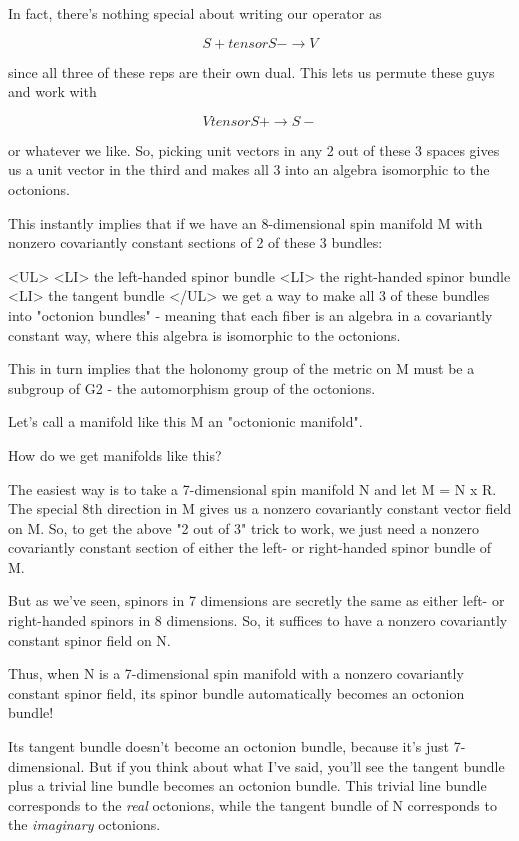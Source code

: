 In fact, there's nothing special about writing our operator as


$$

S+ tensor S- \to  V
$$
    
since all three of these reps are their own dual.  This lets us
permute these guys and work with


$$

V tensor S+ \to  S-
$$
    
or whatever we like.   So, picking unit vectors in any 2 out of these
3 spaces gives us a unit vector in the third and makes all 3 into an
algebra isomorphic to the octonions.

This instantly implies that if we have an 8-dimensional spin manifold M 
with nonzero covariantly constant sections of 2 of these 3 bundles:
 
<UL>
<LI>
the left-handed spinor bundle
<LI>
the right-handed spinor bundle
<LI>
the tangent bundle
</UL>
we get a way to make all 3 of these bundles into "octonion bundles" -
meaning that each fiber is an algebra in a covariantly constant way, 
where this algebra is isomorphic to the octonions.

This in turn implies that the holonomy group of the metric on M must 
be a subgroup of G2 - the automorphism group of the octonions.  

Let's call a manifold like this M an "octonionic manifold".

How do we get manifolds like this?
 
The easiest way is to take a 7-dimensional spin manifold N and let 
M = N x R.  The special 8th direction in M gives us a nonzero 
covariantly constant vector field on M.  So, to get the above 
"2 out of 3" trick to work, we just need a nonzero covariantly 
constant section of either the left- or right-handed spinor bundle 
of M.

But as we've seen, spinors in 7 dimensions are secretly the same
as either left- or right-handed spinors in 8 dimensions.  So, it
suffices to have a nonzero covariantly constant spinor field on N.

Thus, when N is a 7-dimensional spin manifold with a nonzero covariantly 
constant spinor field, its spinor bundle automatically becomes an octonion 
bundle!  


Its tangent bundle doesn't become an octonion bundle, because it's
just 7-dimensional.  But if you think about what I've said, you'll see
the tangent bundle plus a trivial line bundle becomes an octonion
bundle.  This trivial line bundle corresponds to the \emph{real}
octonions, while the tangent bundle of N corresponds to the
\emph{imaginary} octonions.



